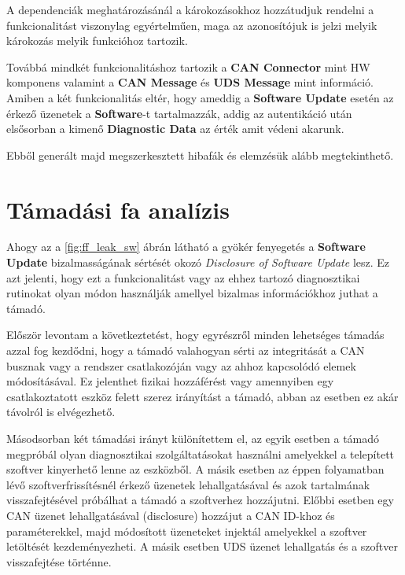 A dependenciák meghatározásánál a károkozásokhoz hozzátudjuk rendelni a funkcionalitást viszonylag egyértelműen, maga az azonosítójuk is jelzi melyik károkozás melyik funkcióhoz tartozik.

Továbbá mindkét funkcionalitáshoz tartozik a \textbf{CAN Connector} mint HW komponens valamint a \textbf{CAN Message} és \textbf{UDS Message} mint információ. Amiben a két funkcionalitás eltér, hogy ameddig a \textbf{Software Update} esetén az érkező üzenetek a \textbf{Software}-t tartalmazzák, addig az autentikáció után elsősorban a kimenő \textbf{Diagnostic Data} az érték amit védeni akarunk.

Ebből generált majd megszerkesztett hibafák és elemzésük alább megtekinthető. \\
\newpage

\section{Támadási fa analízis}

Ahogy az a \ref{fig:ff_leak_sw} ábrán látható a gyökér fenyegetés a \textbf{Software Update} bizalmasságának sértését okozó \textit{Disclosure of Software Update} lesz. Ez azt jelenti, hogy ezt a funkcionalitást vagy az ehhez tartozó diagnosztikai rutinokat olyan módon használják amellyel bizalmas információkhoz juthat a támadó.

Először levontam a következtetést, hogy egyrészről minden lehetséges támadás azzal fog kezdődni, hogy a támadó valahogyan sérti az integritását a CAN busznak vagy a rendszer csatlakozóján vagy az ahhoz kapcsolódó elemek módosításával. Ez jelenthet fizikai hozzáférést vagy amennyiben egy csatlakoztatott eszköz felett szerez irányítást a támadó, abban az esetben ez akár távolról is elvégezhető.

Másodsorban két támadási irányt különítettem el, az egyik esetben a támadó megpróbál olyan diagnosztikai szolgáltatásokat használni amelyekkel a telepített szoftver kinyerhető lenne az eszközből. A másik esetben az éppen folyamatban lévő szoftverfrissítésnél érkező üzenetek lehallgatásával és azok tartalmának visszafejtésével próbálhat a támadó a szoftverhez hozzájutni. Előbbi esetben egy CAN üzenet lehallgatásával (disclosure) hozzájut a CAN ID-khoz és paraméterekkel, majd módosított üzeneteket injektál amelyekkel a szoftver letöltését kezdeményezheti. A másik esetben UDS üzenet lehallgatás és a szoftver visszafejtése történne.

